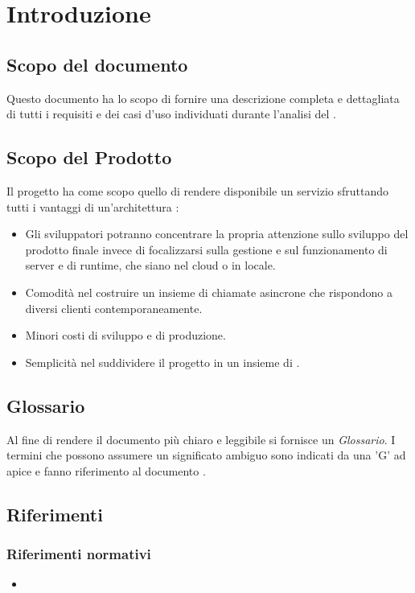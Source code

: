 \section{Introduzione}\label{Intro}

\subsection{Scopo del documento}
Questo documento ha lo scopo di fornire una descrizione completa e dettagliata di tutti i requisiti e dei casi d'uso individuati durante l'analisi del  \NomeProgetto{}.

\subsection{Scopo del Prodotto}
Il progetto {\NomeProgetto} ha come scopo quello di rendere disponibile un servizio  sfruttando tutti i vantaggi di un'architettura :
\begin{itemize}
  \item Gli sviluppatori potranno concentrare la propria attenzione sullo sviluppo del prodotto finale invece di focalizzarsi sulla gestione e sul funzionamento di server e di runtime, che siano nel cloud o in locale.
  \item Comodità nel costruire un insieme di chiamate asincrone che rispondono a diversi clienti contemporaneamente.
  \item Minori costi di sviluppo e di produzione.
  \item Semplicità nel suddividere il progetto in un insieme di .
\end{itemize}

\subsection{Glossario}
Al fine di rendere il documento più chiaro e leggibile si fornisce un \textit{Glossario}. I termini che possono assumere un significato ambiguo sono indicati da una 'G' ad apice e fanno riferimento al documento .

\subsection{Riferimenti}

\subsubsection{Riferimenti normativi}
\begin{itemize}
	\item {}
\end{itemize}

